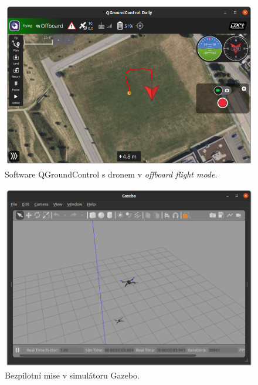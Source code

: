 \begin{figure}[!ht]
  \begin{center}
    \includegraphics[scale=0.43]{obrazky/SIM3}
  \end{center}
  \caption[Software QGroundControl s dronem v \textit{offboard flight mode}]{Software QGroundControl s dronem v \textit{offboard flight mode}.}
  \label{fig:SIM3}
\end{figure}

\begin{figure}[!ht]
  \begin{center}
    \includegraphics[scale=0.4]{obrazky/SIM4}
  \end{center}
  \caption[Bezpilotní mise v simulátoru Gazebo]{Bezpilotní mise v simulátoru Gazebo.}
  \label{fig:SIM4}
\end{figure}